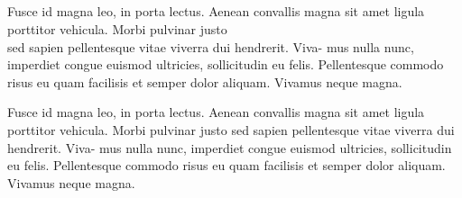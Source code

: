 
\newpage \begin{appendices} 
\appendixtocon %

\appendixpage %

\subsection*{\listappendixname}
\listofappendices

\begin{subappendices}
\renewcommand{\setthesubsection}{\arabic{subsection}:}%


\label{appendix1}
Fusce id magna leo, in porta lectus. Aenean convallis magna sit amet ligula
porttitor vehicula. Morbi pulvinar justo\\
sed sapien pellentesque vitae viverra dui hendrerit. Viva- mus nulla nunc,
imperdiet congue euismod ultricies, sollicitudin eu felis. Pellentesque commodo
risus eu quam facilisis et semper dolor aliquam. Vivamus neque magna.

\newpage
{}
\label{appendix2}
Fusce id magna leo, in porta lectus. Aenean convallis magna sit amet ligula
porttitor vehicula. Morbi pulvinar justo sed sapien pellentesque vitae viverra
dui hendrerit. Viva- mus nulla nunc, imperdiet congue euismod ultricies,
sollicitudin eu felis. Pellentesque commodo risus eu quam facilisis et semper
dolor aliquam. Vivamus neque magna.


\end{subappendices}
\end{appendices}

